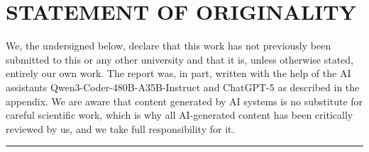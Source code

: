 \documentclass[../report.tex]{subfiles}
\begin{document}
\section*{STATEMENT OF ORIGINALITY}
\noindent We, the undersigned below, declare that this work has not previously been submitted to this or any other university and that it is, unless otherwise stated, entirely our own work. The report was, in part, written with the help of the AI assistants Qwen3-Coder-480B-A35B-Instruct and ChatGPT-5 as described in the appendix. We are aware that content generated by AI systems is no substitute for careful scientific work, which is why all AI-generated content has been critically reviewed by us, and we take full responsibility for it.

\vspace{1cm}

\hrule width 0.45\linewidth
\hfill \hspace{0.025\linewidth}
\hrulefill

\end{document}
